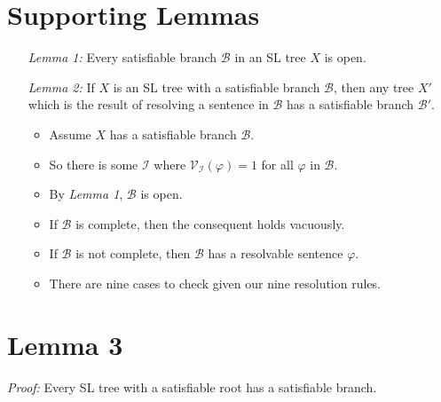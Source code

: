 \documentclass[a4paper, 11pt]{article} %
\newcommand{\I}{\mathcal{I}}
\newcommand{\B}{\mathcal{B}}
\newcommand{\V}[1]{\mathcal{V}_{#1}} %
\begin{document}
\section*{Supporting Lemmas}

\begin{enumerate}
  \item[\it Lemma 1:] Every satisfiable branch $\B$ in an SL tree $X$ is open. 
  \item[\it Lemma 2:] If $X$ is an SL tree with a satisfiable branch $\B$, then any tree $X'$ which is the result of resolving a sentence in $\B$ has a satisfiable branch $\B'$.  
    \begin{itemize}
      \item Assume $X$ has a satisfiable branch $\B$.
      \item So there is some $\I$ where $\V{\I}(\varphi)=1$ for all $\varphi$ in $\B$.
      \item By \textit{Lemma 1}, $\B$ is open. 
      \item If $\B$ is complete, then the consequent holds vacuously. 
      \item If $\B$ is not complete, then $\B$ has a resolvable sentence $\varphi$.
      \item There are nine cases to check given our nine resolution rules.
    \end{itemize}
\end{enumerate}




\section*{Lemma 3}

\textit{Proof:} Every SL tree with a satisfiable root has a satisfiable branch.
\end{document}
